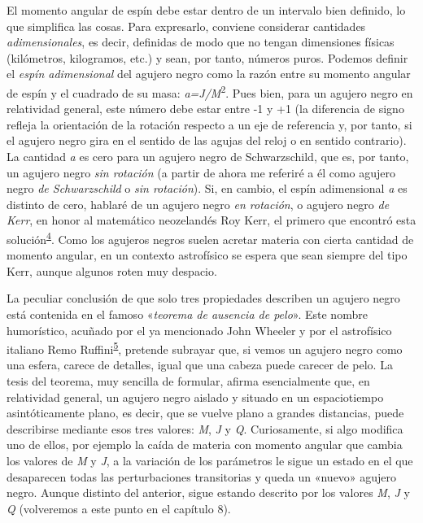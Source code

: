 El momento angular de espín debe estar dentro de un intervalo bien definido, lo que simplifica las cosas. Para expresarlo, conviene considerar cantidades \emph{adimensionales}, es decir, definidas de modo que no tengan dimensiones físicas (kilómetros, kilogramos, etc.) y sean, por tanto, números puros. Podemos definir el \emph{espín adimensional} del agujero negro como la razón entre su momento angular de espín y el cuadrado de su masa: \emph{a=J/M}\textsuperscript{2}. Pues bien, para un agujero negro en relatividad general, este número debe estar entre -1 y +1 (la diferencia de signo refleja la orientación de la rotación respecto a un eje de referencia y, por tanto, si el agujero negro gira en el sentido de las agujas del reloj o en sentido contrario). La cantidad \emph{a} es cero para un agujero negro de Schwarzschild, que es, por tanto, un agujero negro \emph{sin rotación} (a partir de ahora me referiré a él como agujero negro \emph{de Schwarzschild} o \emph{sin rotación}). Si, en cambio, el espín adimensional \emph{a} es distinto de cero, hablaré de un agujero negro \emph{en rotación}, o agujero negro \emph{de Kerr}, en honor al matemático neozelandés Roy Kerr, el primero que encontró esta solución\textsuperscript{\hyperlink{note:06-04}{4}}. Como los agujeros negros suelen acretar materia con cierta cantidad de momento angular, en un contexto astrofísico se espera que sean siempre del tipo Kerr, aunque algunos roten muy despacio.

La peculiar conclusión de que solo tres propiedades describen un agujero negro está contenida en el famoso «\emph{teorema de ausencia de pelo}». Este nombre humorístico, acuñado por el ya mencionado John Wheeler y por el astrofísico italiano Remo Ruffini\textsuperscript{\hyperlink{note:06-05}{5}}, pretende subrayar que, si vemos un agujero negro como una esfera, carece de detalles, igual que una cabeza puede carecer de pelo. La tesis del teorema, muy sencilla de formular, afirma esencialmente que, en relatividad general, un agujero negro aislado y situado en un espaciotiempo asintóticamente plano, es decir, que se vuelve plano a grandes distancias, puede describirse mediante esos tres valores: \emph{M}, \emph{J} y \emph{Q}. Curiosamente, si algo modifica uno de ellos, por ejemplo la caída de materia con momento angular que cambia los valores de \emph{M} y \emph{J}, a la variación de los parámetros le sigue un estado en el que desaparecen todas las perturbaciones transitorias y queda un «nuevo» agujero negro. Aunque distinto del anterior, sigue estando descrito por los valores \emph{M}, \emph{J} y \emph{Q} (volveremos a este punto en el capítulo 8).

